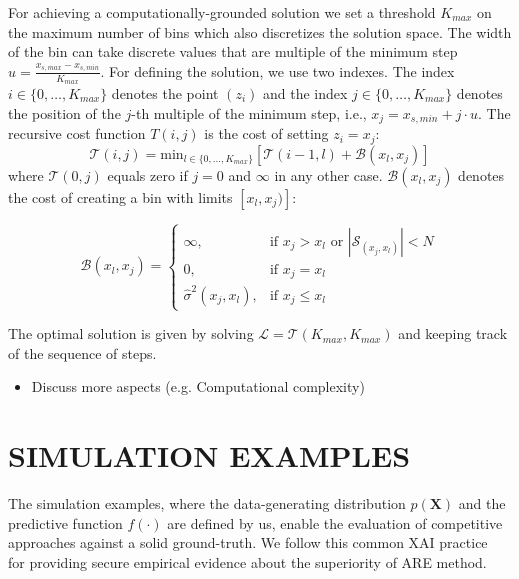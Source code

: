 \documentclass[twoside]{article}
\begin{document}
For achieving a computationally-grounded solution we set a threshold
\(K_{max}\) on the maximum number of bins which also discretizes the
solution space. The width of the bin can take discrete values that are
multiple of the minimum step
\(u = \frac{x_{s, max} - x_{s, min}}{K_{max}}\). For defining the
solution, we use two indexes. The index
\(i \in \{0, \ldots, K_{max}\}\) denotes the point \((z_i)\) and the
index \(j \in \{0, \ldots, K_{max}\} \) denotes the position of the
\(j\)-th multiple of the minimum step, i.e., 
\(x_j = x_{s,min} + j \cdot u\). The recursive cost function
\(T(i,j)\) is the cost of setting \(z_i=x_j\):
\begin{equation}
  \label{eq:recursive_cost}
  \mathcal{T}(i,j) = \mathrm{min}_{l \in \{0, \ldots, K_{max}\}} \left [ \mathcal{T}(i-1, l) + \mathcal{B}(x_l, x_j) \right ]
\end{equation}
%
where \(\mathcal{T}(0,j)\) equals zero if \(j=0\) and \(\infty\) in
any other case. \(\mathcal{B}(x_l, x_j)\) denotes the cost of creating a bin
with limits \([x_l, x_j)]\):

\begin{equation}
  \label{eq:cost_step}
  \mathcal{B}(x_l, x_j) = \begin{cases}
                            \infty, & \text{if $x_j > x_l$ or \(|\mathcal{S}_{(x_j, x_l)}| < N\)}\\
                            0, & \text{if $x_j = x_l$}\\
                            \hat{\sigma}^2(x_j, x_l), &\text{if $x_j \leq x_l$}
  \end{cases}
\end{equation}

The optimal solution is given by solving
\(\mathcal{L} = \mathcal{T}(K_{max}, K_{max})\) and keeping track of the sequence of
steps. 

\noindent

\begin{itemize}
\item Discuss more aspects (e.g. Computational complexity)
\end{itemize}

\section{SIMULATION EXAMPLES}
\label{sec:simulation-examples}

The simulation examples, where the data-generating distribution
\(p(\mathbf{X})\) and the predictive function \(f(\cdot)\) are defined
by us, enable the evaluation of competitive approaches against a solid
ground-truth. We follow this common XAI
practice~\citep{aas2021explaining, herbinger2022repid} for providing
secure empirical evidence about the superiority of ARE method.
\end{document}
